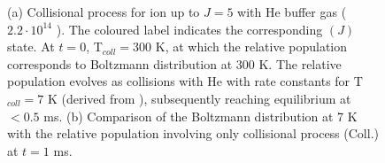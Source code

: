 \begin{figure}[!htb]
    \hfill
    
    \caption{(a) Collisional process for \CD ion up to $J=5$ with He buffer gas ($2.2 \cdot 10^{14}$ \percc). The coloured label indicates the corresponding \CD$(J)$ state. At $t=0$, T$_{coll}=300$ K, at which the relative population corresponds to Boltzmann distribution at 300 K. The relative population evolves as collisions with He with rate constants for T$_{coll}=7$ K (derived from \cite{Werfelli2017}), subsequently reaching equilibrium at $<0.5$ ms. (b) Comparison of the Boltzmann distribution at 7 K with the relative population involving only collisional process (Coll.) at $t=1$ ms.}
    \label{fig:ROSAA-sim-collisional-boltzman-comparision}
\end{figure}